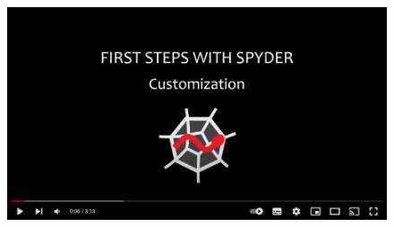\begin{enumerate}
\begin{figure}[H]
    \centering
    \includegraphics[scale=0.4]{Imagenes/Guia_IDE_14.png}
\end{figure}
\end{enumerate}



